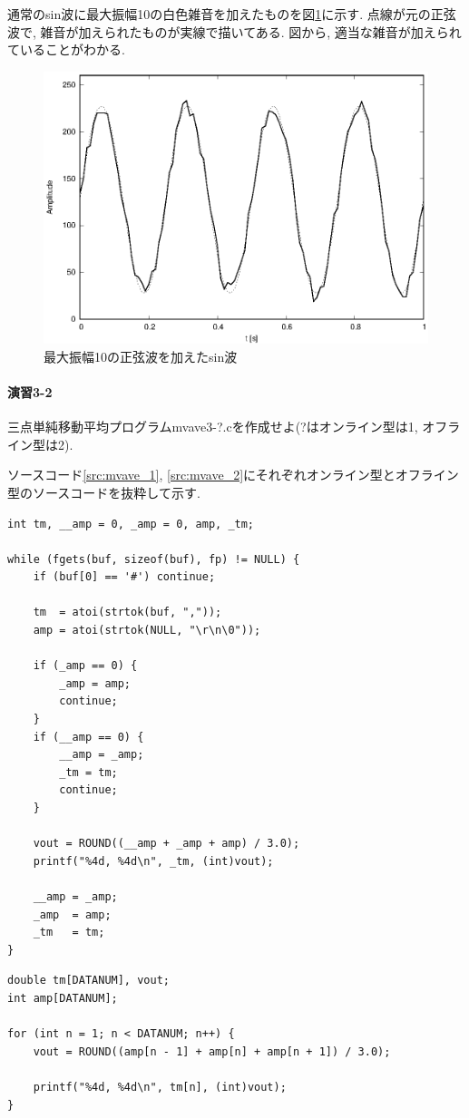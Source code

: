 \documentclass[titlepage]{jsarticle}
\begin{document}
        通常のsin波に最大振幅10の白色雑音を加えたものを図\ref{fig:sin_wn}に示す.
        点線が元の正弦波で, 雑音が加えられたものが実線で描いてある.
        図から, 適当な雑音が加えられていることがわかる.

        \begin{figure}[ht]
            \centering
            \includegraphics[width=12cm]{images/sin_wn.eps}
            \caption{最大振幅10の正弦波を加えたsin波}
            \label{fig:sin_wn}
        \end{figure}

    \paragraph{演習3-2} 三点単純移動平均プログラムmvave3-?.cを作成せよ(?はオンライン型は1,
    オフライン型は2).

        ソースコード\ref{src:mvave_1}, \ref{src:mvave_2}にそれぞれオンライン型とオフライン型のソースコードを抜粋して示す.

        \begin{lstlisting}[caption=mvave3-1.c, label=src:mvave_1]
int tm, __amp = 0, _amp = 0, amp, _tm;

while (fgets(buf, sizeof(buf), fp) != NULL) {
    if (buf[0] == '#') continue;
    
    tm  = atoi(strtok(buf, ","));
    amp = atoi(strtok(NULL, "\r\n\0"));

    if (_amp == 0) {
        _amp = amp;
        continue;
    }
    if (__amp == 0) {
        __amp = _amp;
        _tm = tm;
        continue;
    }

    vout = ROUND((__amp + _amp + amp) / 3.0);
    printf("%4d, %4d\n", _tm, (int)vout);

    __amp = _amp;
    _amp  = amp;
    _tm   = tm;
}
        \end{lstlisting}
        \begin{lstlisting}[caption=mvave3-2.c, label=src:mvave_2]
double tm[DATANUM], vout;
int amp[DATANUM];

for (int n = 1; n < DATANUM; n++) {
    vout = ROUND((amp[n - 1] + amp[n] + amp[n + 1]) / 3.0);

    printf("%4d, %4d\n", tm[n], (int)vout);
}
        \end{lstlisting}
\end{document}
